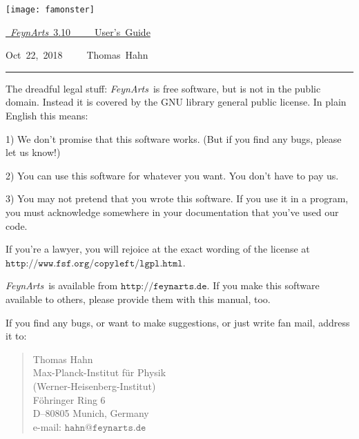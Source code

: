 \documentclass[twoside,12pt]{article}
\def\FA{\textit{FeynArts}}
\def\Code#1{\ensuremath{\texttt{#1}}}
\begin{document}
\thispagestyle{empty}

\vspace*{.2\textheight}

\hfill\texttt{[image: famonster]}

\bigskip\bigskip

\hfill\hbox{\underline{%
\vrule width 0pt height 0pt depth 2ex%
\Huge \FA\ 3.10~~~~~User's Guide}}

\vspace*{1ex}

\hfill\hbox{Oct 22, 2018~~~~~Thomas Hahn}

\clearpage

\vspace*{.5\textheight}
\vfill

\hrule

\medskip

\begin{scriptsize}
The dreadful legal stuff:
\FA\ is free software, but is not in the public domain.
Instead it is covered by the GNU library general public license.
In plain English this means:

1) We don't promise that this software works.   
(But if you find any bugs, please let us know!)

2) You can use this software for whatever you want.
You don't have to pay us.

3) You may not pretend that you wrote this software.
If you use it in a program, you must acknowledge
somewhere in your documentation that you've used  
our code.

If you're a lawyer, you will rejoice at the exact wording of the license 
at \Code{http://www.fsf.org/copyleft/lgpl.html}.

\FA\ is available from \Code{http://feynarts.de}.  If you make this
software available to others, please provide them with this manual, too.

If you find any bugs, or want to make suggestions, or just write fan mail,
address it to:
\vspace*{-2ex}
\begin{quote}
Thomas Hahn \\
Max-Planck-Institut f\"ur Physik \\
(Werner-Heisenberg-Institut) \\
F\"ohringer Ring 6 \\
D--80805 Munich, Germany \\
e-mail: \Code{hahn@feynarts.de}
\end{quote}
\end{scriptsize}
\end{document}
